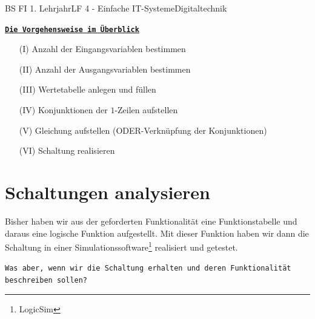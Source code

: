 \documentclass[11pt,twocolumn,oneside,openany,headings=optiontotoc,11pt,numbers=noenddot]{article}
\begin{document}
\begin{worksheet}{BS FI 1. Lehrjahr}{LF 4 - Einfache IT-Systeme}{Digitaltechnik}
		\par\noindent
		\texttt{\underline{\textbf{Die Vorgehensweise im Überblick}}}
		\begin{itemize}
			\item[(I)] Anzahl der Eingangsvariablen bestimmen
			\item[(II)] Anzahl der Ausgangsvariablen bestimmen
			\item[(III)] Wertetabelle anlegen und füllen
			\item[(IV)] Konjunktionen der \(1\)-Zeilen aufstellen
			\item[(V)] Gleichung aufstellen (ODER-Verknüpfung der Konjunktionen)
			\item[(VI)] Schaltung realisieren		
		\end{itemize}
		\newpage
		\section{Schaltungen analysieren}
		Bisher haben wir aus der geforderten Funktionalität eine Funktionstabelle und daraus eine logische Funktion aufgestellt. Mit dieser Funktion haben wir dann die Schaltung in einer Simulationssoftware\footnote{LogicSim} realisiert und getestet.\\
		\par\noindent
		\texttt{Was aber, wenn wir die Schaltung erhalten und deren Funktionalität beschreiben sollen?}

\end{worksheet}
\end{document}
